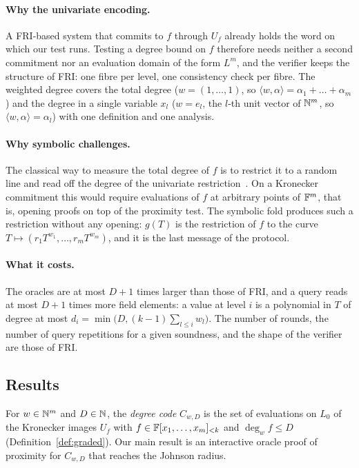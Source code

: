 \paragraph{Why the univariate encoding.} A FRI-based system that commits to $f$ through
$U_f$ already holds the word on which our test runs. Testing a degree bound on $f$ therefore
needs neither a second commitment nor an evaluation domain of the form $L^m$, and the
verifier keeps the structure of FRI: one fibre per level, one consistency check per fibre.
The weighted degree covers the total degree
($w=(1,\dots,1)$, so $\langle w,\alpha\rangle=\alpha_1+\dots+\alpha_m$) and the degree in a
single variable $x_l$ ($w=e_l$, the $l$-th unit vector of $\mathbb{N}^m$, so
$\langle w,\alpha\rangle=\alpha_l$) with one definition and one analysis.

\paragraph{Why symbolic challenges.} The classical way to measure the total degree of $f$ is
to restrict it to a random line and read off the degree of the univariate
restriction~\cite{RS96}. On a Kronecker commitment this would require evaluations of $f$ at
arbitrary points of $\mathbb{F}^m$, that is, opening proofs on top of the proximity test. The symbolic
fold produces such a restriction without any opening: $g(T)$ is the restriction of $f$ to the
curve $T\mapsto(r_1T^{w_1},\dots,r_mT^{w_m})$, and it is the last message of the protocol.

\paragraph{What it costs.} The oracles are at most $D+1$ times larger than those of FRI, and a
query reads at most $D+1$ times more field elements: a value at level $i$ is a polynomial in
$T$ of degree at most $d_i=\min\big(D,(k-1)\sum_{l\le i}w_l\big)$. The number of rounds, the
number of query repetitions for a given soundness, and the shape of the verifier are those of
FRI.

\subsection{Results}\label{sec:intro-results}

For $w\in\mathbb{N}^m$ and $D\in\mathbb{N}$, the \emph{degree code} $C_{w,D}$ is the set of evaluations on
$L_0$ of the Kronecker images $U_f$ with $f\in\mathbb{F}[x_1,\dots,x_m]_{<k}$ and $\deg_wf\le D$
(Definition~\ref{def:graded}). Our main result is an interactive oracle proof of proximity
for $C_{w,D}$ that reaches the Johnson radius.

